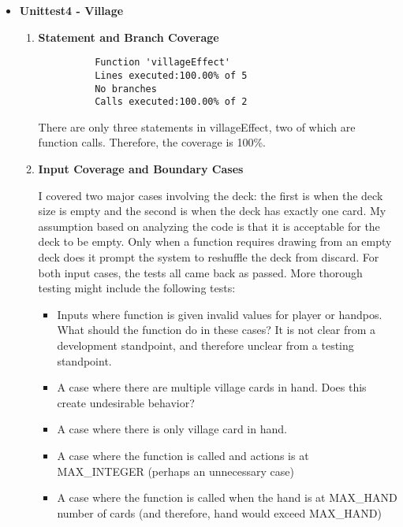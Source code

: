\documentclass[11pt,letterpaper]{article}
\begin{document}
\begin{enumerate}[label=\Roman*.]
\begin{itemize}[leftmargin=*]
      \item \textbf{Unittest4 - Village}
      
        \begin{enumerate}[leftmargin=*]
          \item \textbf{Statement and Branch Coverage}

          \begin{lstlisting}
          Function 'villageEffect'
          Lines executed:100.00% of 5
          No branches
          Calls executed:100.00% of 2
          \end{lstlisting}
          
            There are only three statements in villageEffect, two of which are
            function calls. Therefore, the coverage is 100\%.

        \item \textbf{Input Coverage and Boundary Cases}

          I covered two major cases involving the deck: the first is when the deck size is empty and 
            the second is when the deck has exactly one card. My assumption based on analyzing the
            code is that it is acceptable for the deck to be empty. Only when a function requires
            drawing from an empty deck does it prompt the system to reshuffle the deck from discard.
            For both input cases, the tests all came back as passed. More thorough testing might
            include the following tests:
          \begin{itemize}
            \item Inputs where function is given invalid values for player or handpos. What
                should the function do in these cases? It is not clear from a development
                standpoint, and therefore unclear from a testing standpoint. 
            \item A case where there are multiple village cards in hand. Does this create
              undesirable behavior?
            \item A case where there is only village card in hand.
            \item A case where the function is called and actions is at MAX\_INTEGER (perhaps an unnecessary case)
            \item A case where the function is called when the hand is at MAX\_HAND number of cards (and therefore, hand would exceed MAX\_HAND)
          \end{itemize}
        \end{enumerate}


\end{itemize}
\end{enumerate}
\end{document}
